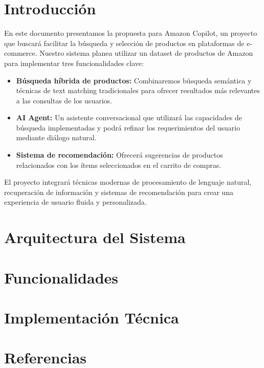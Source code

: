 \documentclass[12pt]{article}
\begin{document}
\section{Introducción}
En este documento presentamos la propuesta para Amazon Copilot, un proyecto que buscará facilitar la búsqueda y selección de productos en plataformas de e-commerce. Nuestro sistema planea utilizar un dataset de productos de Amazon para implementar tres funcionalidades clave:

\begin{itemize}
    \item \textbf{Búsqueda híbrida de productos:} Combinaremos búsqueda semántica y técnicas de text matching tradicionales para ofrecer resultados más relevantes a las consultas de los usuarios.

    \item \textbf{AI Agent:} Un asistente conversacional que utilizará las capacidades
          de búsqueda implementadas y podrá refinar los requerimientos del usuario mediante
          diálogo natural.

    \item \textbf{Sistema de recomendación:} Ofrecerá sugerencias de productos relacionados con los ítems seleccionados en el carrito de compras.
\end{itemize}

El proyecto integrará técnicas modernas de procesamiento de lenguaje natural, recuperación de información y sistemas de recomendación para crear una experiencia de usuario fluida y personalizada.

\newpage
\section{Arquitectura del Sistema}

\section{Funcionalidades}

\section{Implementación Técnica}

\section{Referencias}
\end{document}
